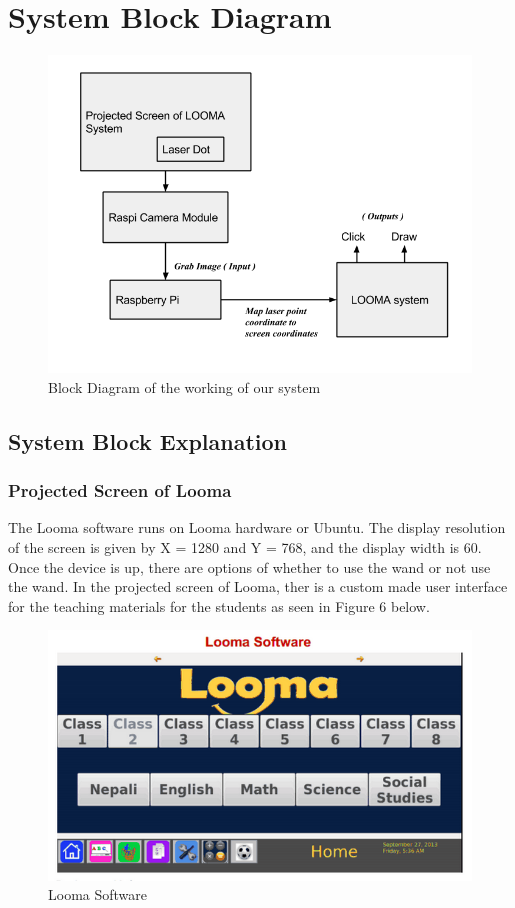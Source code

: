\documentclass[12pt, a4paper]{article}
\begin{document}
\section{System Block Diagram}
\begin{figure}[htp]
\centering
\includegraphics[scale=0.45]{block_diagram.png}
\caption{Block Diagram of the working of our system}
\label{ }
\end{figure}
\subsection{System Block Explanation}
\subsubsection{Projected Screen of Looma}

The Looma software runs on Looma hardware or Ubuntu. The display resolution of the screen is given by X = 1280 and Y = 768, and the display width is 60. Once the device is up, there are options of whether to use the wand or not use the wand. In the projected screen of Looma, ther is a custom made user interface for the teaching materials for the students as seen in Figure 6 below.

\begin{figure}[htp]
	\centering
		\includegraphics[scale=0.19]{loomasoftware.png}
	\caption{Looma Software}
\label{}
\end{figure}
\end{document}
